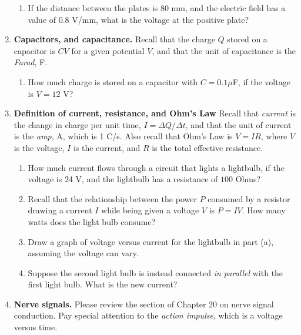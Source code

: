 \documentclass[10pt]{article}
\begin{document}
\begin{enumerate}
\begin{enumerate}
\item 	If the distance between the plates is 80 mm, and the electric field has a value of 0.8 V/mm, what is the voltage at the positive plate? \\ \vspace{1cm}
\end{enumerate}
\item \textbf{Capacitors, and capacitance.} Recall that the charge $Q$ stored on a capacitor is $CV$ for a given potential $V$, and that the unit of capacitance is the \textit{Farad}, F.
\begin{enumerate}
\item How much charge is stored on a capacitor with $C = 0.1\mu$F, if the voltage is $V = 12$ V? \\ \vspace{0.75cm}
\end{enumerate}
\item \textbf{Definition of current, resistance, and Ohm's Law} Recall that \textit{current} is the change in charge per unit time, $I = \Delta Q/\Delta t$, and that the unit of current is the \textit{amp}, A, which is 1 C/s.  Also recall that Ohm's Law is $V=IR$, where $V$ is the voltage, $I$ is the current, and $R$ is the total effective resistance.
\begin{enumerate}
\item How much current flows through a circuit that lights a lightbulb, if the voltage is 24 V, and the lightbulb has a resistance of $100$ Ohms? \\ \vspace{1cm}
\item Recall that the relationship between the power $P$ consumed by a resistor drawing a current $I$ while being given a voltage $V$ is $P=IV$.  How many watts does the light bulb consume? \\ \vspace{1cm}
\vspace{1cm}
\item Draw a graph of voltage versus current for the lightbulb in part (a), assuming the voltage can vary.\\ \vspace{2cm}
\item Suppose the second light bulb is instead connected \textit{in parallel} with the first light bulb.  What is the new current? \\ \vspace{1cm}
\end{enumerate}
\item \textbf{Nerve signals.} Please review the section of Chapter 20 on nerve signal conduction.  Pay special attention to the \textit{action impulse}, which is a voltage versus time.
\end{enumerate}
\end{document}
